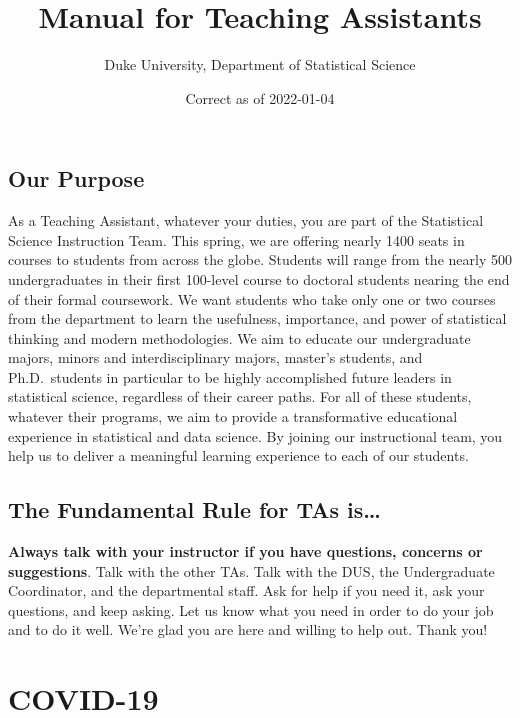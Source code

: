 \documentclass[
]{article}
\title{Manual for Teaching Assistants}
\author{Duke University, Department of Statistical Science}
\date{Correct as of 2022-01-04}
\begin{document}
\maketitle

{
\setcounter{tocdepth}{2}
\tableofcontents
}
\hypertarget{our-purpose}{%
\subsection*{Our Purpose}\label{our-purpose}}

As a Teaching Assistant, whatever your duties, you are part of the Statistical Science Instruction Team. This spring, we are offering nearly 1400 seats in courses to students from across the globe. Students will range from the nearly 500 undergraduates in their first 100-level course to doctoral students nearing the end of their formal coursework. We want students who take only one or two courses from the department to learn the usefulness, importance, and power of statistical thinking and modern methodologies. We aim to educate our undergraduate majors, minors and interdisciplinary majors, master's students, and Ph.D.~students in particular to be highly accomplished future leaders in statistical science, regardless of their career paths. For all of these students, whatever their programs, we aim to provide a transformative educational experience in statistical and data science. By joining our instructional team, you help us to deliver a meaningful learning experience to each of our students.

\hypertarget{the-fundamental-rule-for-tas-is}{%
\subsection*{The Fundamental Rule for TAs is\ldots{}}\label{the-fundamental-rule-for-tas-is}}

\textbf{Always talk with your instructor if you have questions, concerns or suggestions}. Talk with the other TAs. Talk with the DUS, the Undergraduate Coordinator, and the departmental staff. Ask for help if you need it, ask your questions, and keep asking. Let us know what you need in order to do your job and to do it well. We're glad you are here and willing to help out. Thank you!

\hypertarget{covid-19}{%
\section{COVID-19}\label{covid-19}}
\end{document}
